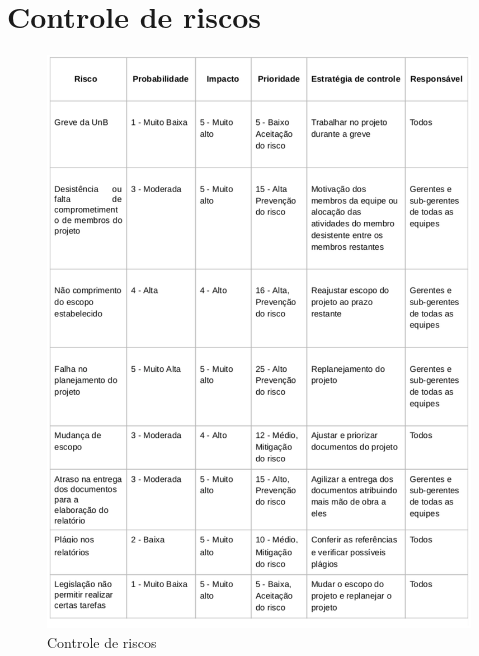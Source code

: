 \section{Controle de riscos}

  \begin{figure}[!htb]
    \centering
    \includegraphics[width=15cm, keepaspectratio=true]{figuras/risco/risco.eps}
    \caption{Controle de riscos}
  \end{figure}

